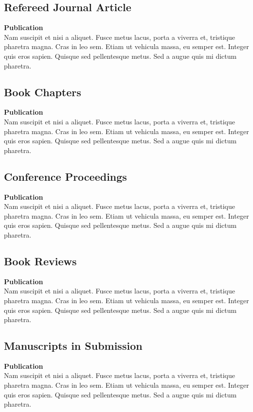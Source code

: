 \documentclass[a4paper,9pt]{extarticle}
\begin{document}
\subsection*{Refereed Journal Article}
\textbf{Publication} \\ 
Nam suscipit et nisi a aliquet. Fusce metus lacus, porta a viverra et, tristique pharetra magna. Cras in leo sem. Etiam ut vehicula massa, eu semper est. Integer quis eros sapien. Quisque sed pellentesque metus. Sed a augue quis mi dictum pharetra. 

\subsection*{Book Chapters}
\textbf{Publication} \\ 
Nam suscipit et nisi a aliquet. Fusce metus lacus, porta a viverra et, tristique pharetra magna. Cras in leo sem. Etiam ut vehicula massa, eu semper est. Integer quis eros sapien. Quisque sed pellentesque metus. Sed a augue quis mi dictum pharetra. 

\subsection*{Conference Proceedings}
\textbf{Publication} \\ 
Nam suscipit et nisi a aliquet. Fusce metus lacus, porta a viverra et, tristique pharetra magna. Cras in leo sem. Etiam ut vehicula massa, eu semper est. Integer quis eros sapien. Quisque sed pellentesque metus. Sed a augue quis mi dictum pharetra. 

\subsection*{Book Reviews}
\textbf{Publication} \\ 
Nam suscipit et nisi a aliquet. Fusce metus lacus, porta a viverra et, tristique pharetra magna. Cras in leo sem. Etiam ut vehicula massa, eu semper est. Integer quis eros sapien. Quisque sed pellentesque metus. Sed a augue quis mi dictum pharetra. 

\subsection*{Manuscripts in Submission}
\textbf{Publication} \\ 
Nam suscipit et nisi a aliquet. Fusce metus lacus, porta a viverra et, tristique pharetra magna. Cras in leo sem. Etiam ut vehicula massa, eu semper est. Integer quis eros sapien. Quisque sed pellentesque metus. Sed a augue quis mi dictum pharetra. 
\end{document}
